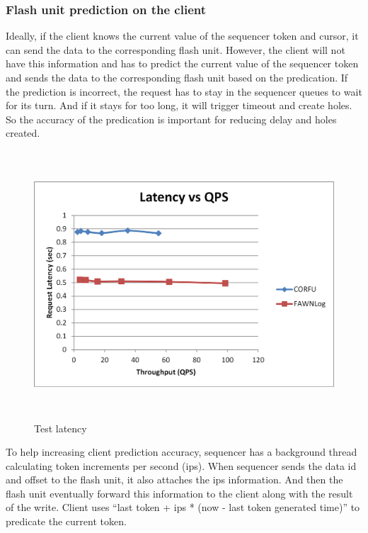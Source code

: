 \documentclass[letterpaper,twocolumn,10pt]{article}
\begin{document}
\subsubsection{Flash unit prediction on the client}

Ideally, if the client knows the current value of the sequencer token and cursor, it can send the data to the corresponding flash unit. However, the client will not have this information and has to predict the current value of the sequencer token and sends the data to the corresponding flash unit based on the predication. If the prediction is incorrect, the request has to stay in the sequencer queues to wait for its turn. And if it stays for too long, it will trigger timeout and create holes. So the accuracy of the predication is important for reducing delay and holes created. 
\vspace{4cm}
\begin{center}
\begin{figure}
  \includegraphics[width=\textwidth, height=10cm]{4.png}
  \caption{Test latency}
\end{figure}
\end{center}

To help increasing client prediction accuracy, sequencer has a background thread calculating token increments per second (ips). When sequencer sends the data id and offset to the flash unit, it also attaches the ips information. And then the flash unit eventually forward this information to the client along with the result of the write. Client uses “last token + ips * (now - last token generated time)” to predicate the current token.
\end{document}
